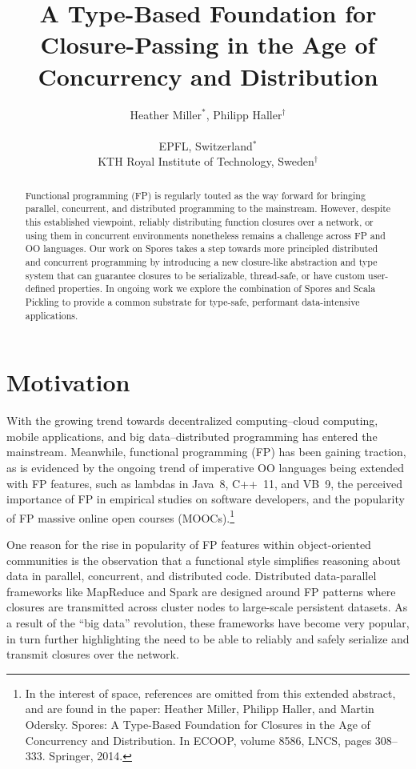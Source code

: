 \documentclass[english]{lni}
\author{
	Heather Miller$^*$, Philipp Haller$^\dagger$ \\
	\\
	EPFL, Switzerland$^*$ \\
	KTH Royal Institute of Technology, Sweden$^\dagger$
}
\title{A Type-Based Foundation for Closure-Passing in the Age of Concurrency and Distribution}
\begin{document}
\maketitle

\begin{abstract}
Functional programming (FP) is regularly touted as the way forward for
bringing parallel, concurrent, and distributed programming to the mainstream.
However, despite this established viewpoint, reliably distributing function
closures over a network, or using them in concurrent environments nonetheless
remains a challenge across FP and OO languages. Our work on Spores takes a
step towards more principled distributed and concurrent programming by
introducing a new closure-like abstraction and type system that can
guarantee closures to be serializable, thread-safe, or have custom
user-defined properties. In ongoing work we explore the combination of
Spores and Scala Pickling to provide a common substrate for type-safe,
performant data-intensive applications.
\end{abstract}

\vspace{-10mm}
\section{Motivation}
\vspace{-4mm}
With the growing trend towards decentralized computing--cloud computing,
mobile applications, and big data--distributed programming has entered the
mainstream. Meanwhile, functional programming (FP) has been
gaining traction, as is evidenced by the ongoing
trend of imperative OO languages being extended
with FP features, such as lambdas in \mbox{Java 8}, \mbox{C++ 11}, and
\mbox{VB 9}, the perceived importance of FP in empirical
studies on software developers, and the popularity of FP
massive online open courses (MOOCs).\footnote{In the interest
of space, references are omitted from this extended abstract, and are found
in the paper: Heather Miller, Philipp Haller, and Martin Odersky. Spores: A
Type-Based Foundation for Closures in the Age of Concurrency and Distribution.
In ECOOP, volume 8586, LNCS, pages 308--333. Springer, 2014.}

One reason for the rise in popularity of FP features within object-oriented
communities is the observation that
a functional style simplifies reasoning about data in
parallel, concurrent, and distributed code. Distributed data-parallel
frameworks like MapReduce and Spark are designed
around FP patterns where closures are transmitted across cluster nodes
to large-scale persistent datasets. As a result of the ``big data''
revolution, these frameworks have become very popular, in turn further
highlighting the need to be able to reliably and safely serialize and transmit
closures over the network.
\end{document}

